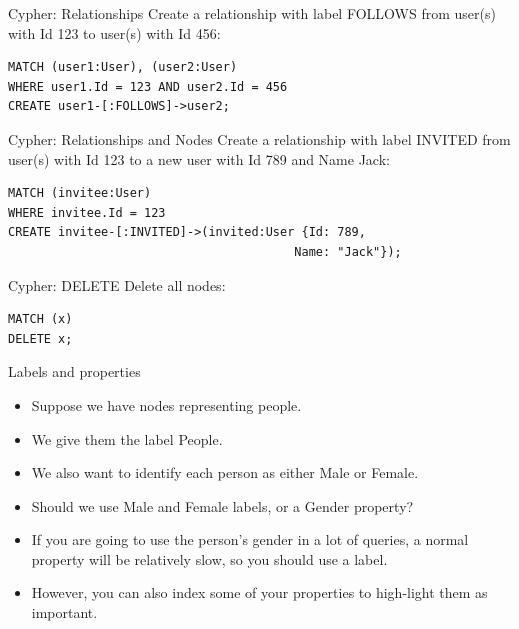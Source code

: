 \begin{frame}[fragile]{Cypher: Relationships}
  Create a relationship with label FOLLOWS from user(s) with Id 123 to user(s) with Id 456: 
  \begin{verbatim}
MATCH (user1:User), (user2:User)
WHERE user1.Id = 123 AND user2.Id = 456
CREATE user1-[:FOLLOWS]->user2;
  \end{verbatim}
\end{frame}

\begin{frame}[fragile]{Cypher: Relationships and Nodes}
  Create a relationship with label INVITED from user(s) with Id 123 to a new user with Id 789 and Name Jack: 
  \begin{verbatim}
MATCH (invitee:User)
WHERE invitee.Id = 123
CREATE invitee-[:INVITED]->(invited:User {Id: 789,
                                        Name: "Jack"});
  \end{verbatim}
\end{frame}


\begin{frame}[fragile]{Cypher: DELETE}
  Delete all nodes: 
  \begin{verbatim}
MATCH (x)
DELETE x;
  \end{verbatim}
\end{frame}

\begin{frame}{Labels and properties}
  \begin{itemize}
    \item Suppose we have nodes representing people.
    \item We give them the label People.
    \item We also want to identify each person as either Male or Female.
    \item Should we use Male and Female labels, or a Gender property?
    \item If you are going to use the person's gender in a lot of queries, a normal property will be relatively slow, so you should use a label.
    \item However, you can also index some of your properties to high-light them as important.
    
  \end{itemize}
\end{frame}


